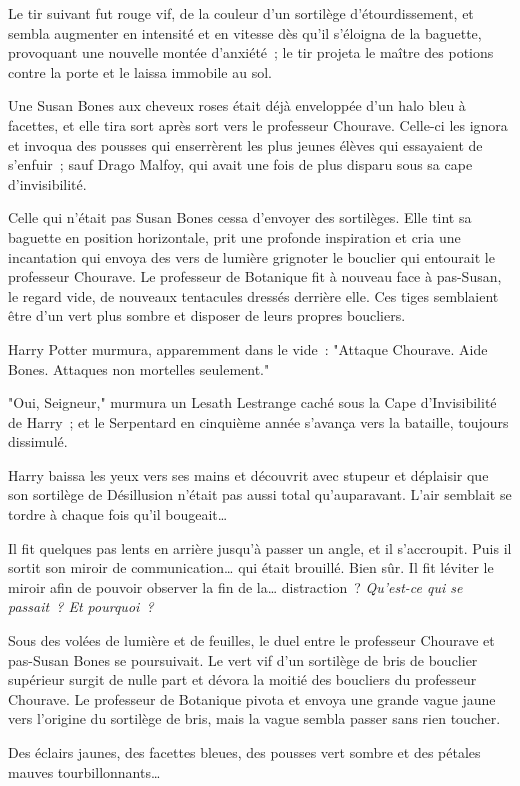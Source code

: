 Le tir suivant fut rouge vif, de la couleur d'un sortilège d'étourdissement, et sembla augmenter en intensité et en vitesse dès qu'il s'éloigna de la baguette, provoquant une nouvelle montée d'anxiété~; le tir projeta le maître des potions contre la porte et le laissa immobile au sol.

Une Susan Bones aux cheveux roses était déjà enveloppée d'un halo bleu à facettes, et elle tira sort après sort vers le professeur Chourave. Celle-ci les ignora et invoqua des pousses qui enserrèrent les plus jeunes élèves qui essayaient de s'enfuir~; sauf Drago Malfoy, qui avait une fois de plus disparu sous sa cape d'invisibilité.

Celle qui n'était pas Susan Bones cessa d'envoyer des sortilèges. Elle tint sa baguette en position horizontale, prit une profonde inspiration et cria une incantation qui envoya des vers de lumière grignoter le bouclier qui entourait le professeur Chourave. Le professeur de Botanique fit à nouveau face à pas-Susan, le regard vide, de nouveaux tentacules dressés derrière elle. Ces tiges semblaient être d'un vert plus sombre et disposer de leurs propres boucliers.

Harry Potter murmura, apparemment dans le vide~: "Attaque Chourave. Aide Bones. Attaques non mortelles seulement."

"Oui, Seigneur," murmura un Lesath Lestrange caché sous la Cape d'Invisibilité de Harry~; et le Serpentard en cinquième année s'avança vers la bataille, toujours dissimulé.

Harry baissa les yeux vers ses mains et découvrit avec stupeur et déplaisir que son sortilège de Désillusion n'était pas aussi total qu'auparavant. L'air semblait se tordre à chaque fois qu'il bougeait…

Il fit quelques pas lents en arrière jusqu'à passer un angle, et il s'accroupit. Puis il sortit son miroir de communication… qui était brouillé. Bien sûr. Il fit léviter le miroir afin de pouvoir observer la fin de la… distraction~? \emph{Qu'est-ce qui se passait~? Et pourquoi~?}

Sous des volées de lumière et de feuilles, le duel entre le professeur Chourave et pas-Susan Bones se poursuivait. Le vert vif d'un sortilège de bris de bouclier supérieur surgit de nulle part et dévora la moitié des boucliers du professeur Chourave. Le professeur de Botanique pivota et envoya une grande vague jaune vers l'origine du sortilège de bris, mais la vague sembla passer sans rien toucher.

Des éclairs jaunes, des facettes bleues, des pousses vert sombre et des pétales mauves tourbillonnants…

